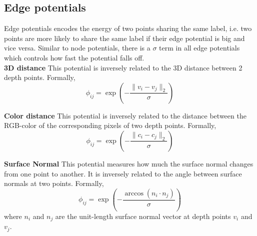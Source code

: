 \documentclass[10pt,twocolumn,letterpaper]{article}
\begin{document}
\subsection{Edge potentials}
Edge potentials encodes the energy of two points sharing the same label, i.e.
two points are more likely to share the same label if their edge potential is
big and vice versa. Similar to node potentials, there is a $\sigma$ term in all
edge potentials which controls how fast the potential falls off.
\\

\indent\textbf{3D distance} This potential is inversely related to the 3D
distance between 2 depth points. Formally,
\begin{equation}
\phi_{ij} = \exp\left(-\frac{\|v_i - v_j\|_2}{\sigma}\right)
\end{equation}

\indent\textbf{Color distance} This potential is inversely related to the distance
between the RGB-color of the corresponding pixels of two depth points.
Formally,
\begin{equation}
\phi_{ij} = \exp\left(-\frac{\|c_i - c_j\|_2}{\sigma}\right)
\end{equation}

\indent\textbf{Surface Normal} This potential measures how much the surface
normal changes from one point to another. It is inversely related to the 
angle between surface normals at two points. Formally,
\begin{equation}
\phi_{ij} = \exp\left(-\frac{\arccos(n_i\cdot n_j)}{\sigma}\right)
\end{equation}
where $n_i$ and $n_j$ are the unit-length surface normal vector at depth points
$v_i$ and $v_j$.
\end{document}
